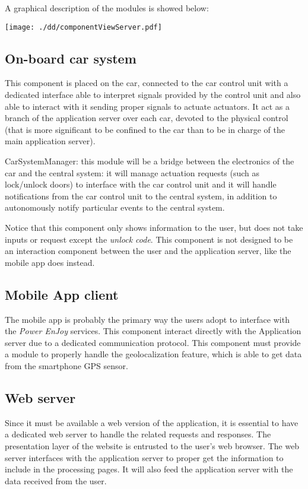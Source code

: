 \documentclass{scrreprt}
\begin{document}
A graphical description of the modules is showed below: 
\begin{center}
		\texttt{[image: ./dd/componentViewServer.pdf]}
\end{center}

\subsection{On-board car system}
This component is placed on the car, connected to the car control unit with a dedicated interface able to interpret signals provided by the control unit and also able to interact with it sending proper signals to actuate actuators.
It act as a branch of the application server over each car, devoted to the physical control (that is more significant to be confined to the car than to be in charge of the main application server).

CarSystemManager: this module will be a bridge between the electronics of the car and the central system: it will manage actuation requests (such as lock/unlock doors) to interface with the car control unit and it will handle notifications from the car control unit to the central system, in addition to autonomously notify particular events to the central system.

Notice that this component only shows information to the user, but does not take inputs or request except the \emph{unlock code}. This component is not designed to be an interaction component between the user and the application server, like the mobile app does instead.

\subsection{Mobile App client}
The mobile app is probably the primary way the users adopt to interface with the \emph{Power EnJoy} services.
This component interact directly with the Application server due to a dedicated communication protocol.
This component must provide a module to properly handle the geolocalization feature, which is able to get data from the smartphone GPS sensor.

\subsection{Web server}
Since it must be available a web version of the application, it is essential to have a dedicated web server to handle the related requests and responses. The presentation layer of the website is entrusted to the user's web browser.
The web server interfaces with the application server to proper get the information to include in the processing pages. It will also feed the application server with the data received from the user.
\end{document}
